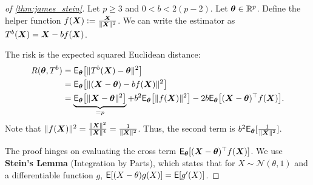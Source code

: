 
\begin{proof}[of \autoref{thm:james_stein}]
Let \(p \ge 3\) and \(0 < b < 2(p-2)\). Let $\boldsymbol{\theta} \in \mathbb{R}^p$.
Define the helper function \(f(\boldsymbol{X}) := \frac{\boldsymbol{X}}{\|\boldsymbol{X}\|^2}\).
We can write the estimator as \(T^b(\boldsymbol{X}) = \boldsymbol{X} - b f(\boldsymbol{X})\).

The risk is the expected squared Euclidean distance:
\begin{align*}
R(\boldsymbol{\theta}, T^b) &= \mathsf{E}_{\boldsymbol{\theta}} \big[ \| T^b(\boldsymbol{X}) - \boldsymbol{\theta} \|^2 \big] \\
&= \mathsf{E}_{\boldsymbol{\theta}} \big[ \| (\boldsymbol{X} - \boldsymbol{\theta}) - b f(\boldsymbol{X}) \|^2 \big] \\
&= \underbrace{\mathsf{E}_{\boldsymbol{\theta}} \big[ \| \boldsymbol{X} - \boldsymbol{\theta} \|^2 \big]}_{=p} + b^2 \mathsf{E}_{\boldsymbol{\theta}} \big[ \| f(\boldsymbol{X}) \|^2 \big] - 2b \mathsf{E}_{\boldsymbol{\theta}} \big[ (\boldsymbol{X} - \boldsymbol{\theta})^\top f(\boldsymbol{X}) \big].
\end{align*}
Note that $\| f(\boldsymbol{X}) \|^2 = \frac{\|\boldsymbol{X}\|^2}{\|\boldsymbol{X}\|^4} = \frac{1}{\|\boldsymbol{X}\|^2}$. Thus, the second term is $b^2 \mathsf{E}_{\boldsymbol{\theta}} [ \frac{1}{\|\boldsymbol{X}\|^2} ]$.

The proof hinges on evaluating the cross term \(\mathsf{E}_{\boldsymbol{\theta}}[(\boldsymbol{X} - \boldsymbol{\theta})^\top f(\boldsymbol{X})]\). We use \textbf{Stein's Lemma} (Integration by Parts), which states that for $X \sim \mathcal{N}(\theta, 1)$ and a differentiable function $g$, $\mathsf{E}[(X-\theta)g(X)] = \mathsf{E}[g'(X)]$.


\end{proof}
